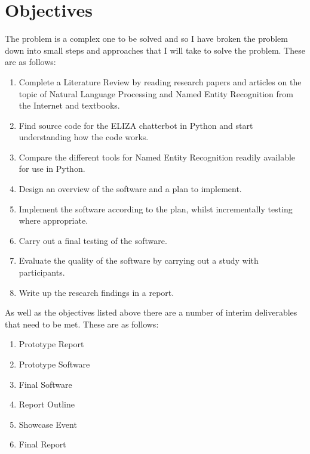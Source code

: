 %
%

\section*{Objectives}
\label{sec:objectives}
The problem is a complex one to be solved and so I have broken the problem down into small steps and approaches that I will take to solve the problem. These are as follows: 

\begin{enumerate}
	\item Complete a Literature Review by reading research papers and articles on the topic of Natural Language Processing and Named Entity Recognition from the Internet and textbooks.
	\item Find source code for the ELIZA chatterbot in Python and start understanding how the code works.
	\item Compare the different tools for Named Entity Recognition readily available for use in Python.
	\item Design an overview of the software and a plan to implement.
	\item Implement the software according to the plan, whilst incrementally testing where appropriate.
	\item Carry out a final testing of the software.
	\item Evaluate the quality of the software by carrying out a study with participants.
	\item Write up the research findings in a report.
\end{enumerate}
As well as the objectives listed above there are a number of interim deliverables that need to be met. These are as follows: 

\begin{enumerate}
	\item Prototype Report
	\item Prototype Software
	\item Final Software
	\item Report Outline
	\item Showcase Event
	\item Final Report
\end{enumerate}